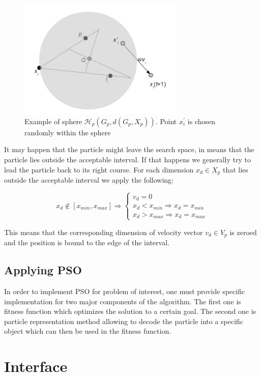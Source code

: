 \documentclass{book}
\begin{document}
\begin{figure}[H]
    \includegraphics[width=0.7\textwidth]{./images/pso_sphere.png}
    \caption{Example of sphere  $\mathcal{H}_p(G_p, d(G_p, X_p))$. Point $x^{'}_{i}$ is chosen randomly within the sphere}
    \label{fig:pso_sphere}
\end{figure}

It may happen that the particle might leave the search space, in means that the particle lies outside the acceptable interval. If that happens we generally try to lead the particle back to its right course. For each dimension $x_{d} \in X_p$ that lies  outside the acceptable interval we apply the following:

\[
x_{d} \notin [x_{min}, x_{max}] \Rightarrow \left \{
\begin{array}{ll}
v_{d} = 0 \\
x_d < x_{min} \Rightarrow x_d = x_{min} \\
x_d > x_{max} \Rightarrow x_d = x_{max}
\end{array}
\right.
\]

This means that the corresponding dimension of velocity vector $v_d \in V_p$ is zeroed and the position is bound to the edge of the interval.

\section{Applying PSO}
In order to implement PSO for problem of interest, one must provide specific implementation for two major components of the algorithm. The first one is fitness function which optimizes the solution to a certain goal. The second one is particle representation method allowing to decode the particle into a specific object which can then be used in the fitness function.


\chapter{Interface}
\end{document}
